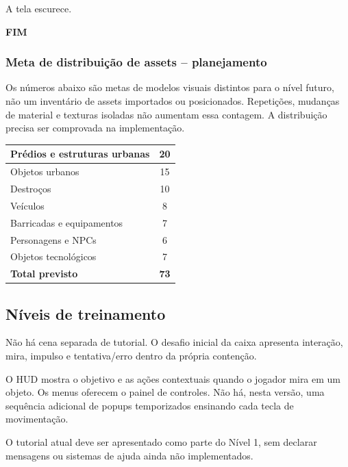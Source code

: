 \documentclass[12pt,a4paper]{article}
\begin{document}
A tela escurece.

\begin{center}
\textbf{FIM}
\end{center}

\subsubsection*{Meta de distribuição de assets -- planejamento}

Os números abaixo são metas de modelos visuais distintos para o
nível futuro, não um inventário de assets importados ou posicionados.
Repetições, mudanças de material e texturas isoladas não aumentam
essa contagem. A distribuição precisa ser comprovada na implementação.


\begin{center}
\begin{tabularx}{\textwidth}{|X|c|}
\hline
Prédios e estruturas urbanas & 20\\
\hline
Objetos urbanos & 15\\
\hline
Destroços & 10\\
\hline
Veículos & 8\\
\hline
Barricadas e equipamentos & 7\\
\hline
Personagens e NPCs & 6\\
\hline
Objetos tecnológicos & 7\\
\hline
\textbf{Total previsto} & \textbf{73}\\
\hline
\end{tabularx}
\end{center}


\subsection{Níveis de treinamento}

Não há cena separada de tutorial. O desafio inicial da caixa apresenta
interação, mira, impulso e tentativa/erro dentro da própria contenção.

O HUD mostra o objetivo e as ações contextuais quando o jogador mira
em um objeto. Os menus oferecem o painel de controles. Não há, nesta
versão, uma sequência adicional de popups temporizados ensinando cada
tecla de movimentação.

O tutorial atual deve ser apresentado como parte do Nível 1, sem
declarar mensagens ou sistemas de ajuda ainda não implementados.
\end{document}
